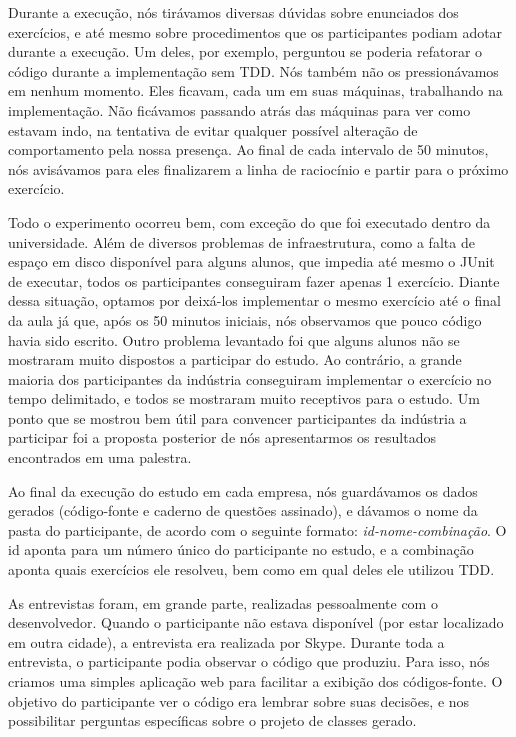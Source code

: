 Durante a execução, nós tirávamos diversas dúvidas sobre enunciados dos
exercícios, e até mesmo sobre procedimentos que os participantes podiam
adotar durante a execução. Um deles, por exemplo, perguntou se poderia
refatorar o código durante a implementação sem TDD. 
Nós também não os pressionávamos em nenhum momento. Eles ficavam,
cada um em suas máquinas, trabalhando na implementação. Não ficávamos 
passando atrás das máquinas para ver como estavam indo, na tentativa
de evitar qualquer possível alteração de comportamento pela nossa presença.
Ao final de cada intervalo de 50 minutos, nós avisávamos para eles finalizarem
a linha de raciocínio e partir para o próximo exercício.

Todo o experimento ocorreu bem, com exceção do que foi executado
dentro da universidade. Além de diversos problemas de infraestrutura,
como a falta de espaço em disco disponível para alguns alunos, que impedia até mesmo
o JUnit de executar, todos os participantes conseguiram fazer apenas
1 exercício. Diante dessa situação, optamos por deixá-los implementar
o mesmo exercício até o final da aula já que, após os 50 minutos iniciais,
nós observamos que pouco código havia sido escrito. Outro problema levantado
foi que alguns alunos não se mostraram muito dispostos a participar
do estudo.
Ao contrário, a grande maioria dos participantes da indústria conseguiram
implementar o exercício no tempo delimitado, e todos se mostraram
muito receptivos para o estudo. Um ponto que se mostrou bem útil
para convencer participantes da indústria a participar foi a proposta
posterior de nós apresentarmos os resultados encontrados em uma palestra.

Ao final da execução do estudo em cada empresa, nós guardávamos
os dados gerados (código-fonte e caderno de questões assinado),
e dávamos o nome da pasta do participante, de acordo com
o seguinte formato: \textit{id-nome-combinação}. O id aponta
para um número único do participante no estudo, e a combinação
aponta quais exercícios ele resolveu, bem como em qual deles
ele utilizou TDD.

As entrevistas foram, em grande parte, realizadas pessoalmente com 
o desenvolvedor. Quando o participante não estava disponível (por estar
localizado em outra cidade), a entrevista era realizada por Skype.
Durante toda a entrevista, o participante podia observar o código que
produziu. Para isso, nós criamos uma simples aplicação web para facilitar
a exibição dos códigos-fonte. O objetivo do participante ver o código
era lembrar sobre suas decisões, e nos possibilitar perguntas específicas
sobre o projeto de classes gerado.

